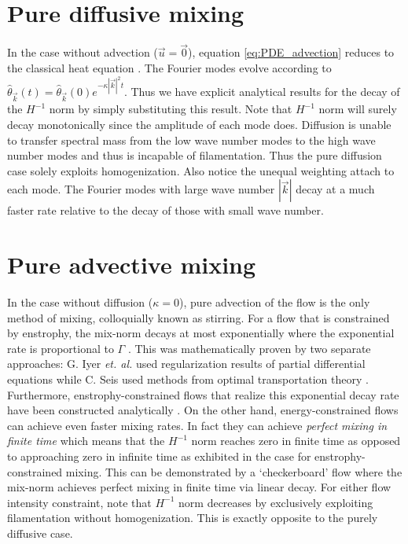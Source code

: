 \section{Pure diffusive mixing}
In the case without advection ($\vec{u}=\vec{0}$), equation \eqref{eq:PDE_advection} reduces to the classical heat equation \cite{Evans2010}. The Fourier modes evolve according to $\hat{\theta}_{\vec{k}}(t)=\hat{\theta}_{\vec{k}}(0)e^{-\kappa|\vec{k}|^2t}$. Thus we have explicit analytical results for the decay of the $H^{-1}$ norm by simply substituting this result. Note that $H^{-1}$ norm will surely decay monotonically since the amplitude of each mode does. Diffusion is unable to transfer spectral mass from the low wave number modes to the high wave number modes and thus is incapable of filamentation. Thus the pure diffusion case solely exploits homogenization. Also notice the unequal weighting attach to each mode. The Fourier modes with large wave number $|\vec{k}|$ decay at a much faster rate relative to the decay of those with small wave number.



\section{Pure advective mixing}
In the case without diffusion ($\kappa = 0$), pure advection of the flow is the only method of mixing, colloquially known as stirring. For a flow that is constrained by enstrophy, the mix-norm decays at most exponentially where the exponential rate is proportional to $\Gamma$ \cite{GI2014,CS2013}. This was mathematically proven by two separate approaches: G. Iyer {\it et. al.} \cite{GI2014} used regularization results of partial differential equations \cite{Crippa} while C. Seis \cite{CS2013} used methods from optimal transportation theory \cite{villani2003topics}. Furthermore, enstrophy-constrained flows that realize this exponential decay rate have been constructed analytically \cite{Alberti2014a}. On the other hand, energy-constrained flows can achieve even faster mixing rates. In fact they can achieve {\it perfect mixing in finite time} which means that the $H^{-1}$ norm reaches zero in finite time as opposed to approaching zero in infinite time as exhibited in the case for enstrophy-constrained mixing. This can be demonstrated by a `checkerboard' flow \cite{JMP2012} where the mix-norm achieves perfect mixing in finite time via linear decay.  For either flow intensity constraint, note that $H^{-1}$ norm decreases by exclusively exploiting filamentation without homogenization. This is exactly opposite to the purely diffusive case.

